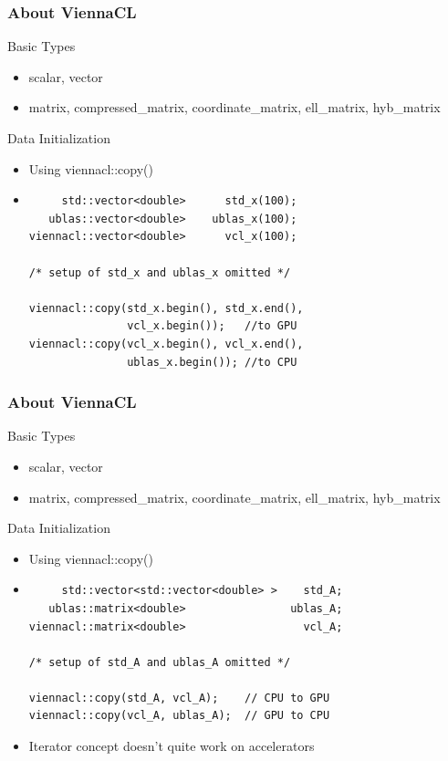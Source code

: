 \begin{frame}[fragile]
\frametitle{About ViennaCL}

 \begin{block}{Basic Types}
   \begin{itemize}
    \item scalar, vector
    \item matrix, compressed\_matrix, coordinate\_matrix, ell\_matrix, hyb\_matrix
   \end{itemize}
 \end{block}

 \begin{block}{Data Initialization}
    \begin{itemize}
     \item Using viennacl::copy() 
    \item  { 
  \begin{lstlisting}
     std::vector<double>      std_x(100);
   ublas::vector<double>    ublas_x(100);
viennacl::vector<double>      vcl_x(100);

/* setup of std_x and ublas_x omitted */

viennacl::copy(std_x.begin(), std_x.end(),
               vcl_x.begin());   //to GPU
viennacl::copy(vcl_x.begin(), vcl_x.end(),
               ublas_x.begin()); //to CPU
  \end{lstlisting} }

 \end{itemize}

 \end{block}
\end{frame}


\begin{frame}[fragile]
\frametitle{About ViennaCL}

 \begin{block}{Basic Types}
   \begin{itemize}
    \item scalar, vector
    \item matrix, compressed\_matrix, coordinate\_matrix, ell\_matrix, hyb\_matrix
   \end{itemize}
 \end{block}

 \begin{block}{Data Initialization}
    \begin{itemize}
     \item Using viennacl::copy() 
    \item  { 
  \begin{lstlisting}
     std::vector<std::vector<double> >    std_A;
   ublas::matrix<double>                ublas_A;
viennacl::matrix<double>                  vcl_A;

/* setup of std_A and ublas_A omitted */

viennacl::copy(std_A, vcl_A);    // CPU to GPU
viennacl::copy(vcl_A, ublas_A);  // GPU to CPU
  \end{lstlisting} }
    \item Iterator concept doesn't quite work on accelerators
 \end{itemize}

 \end{block}
\end{frame}


